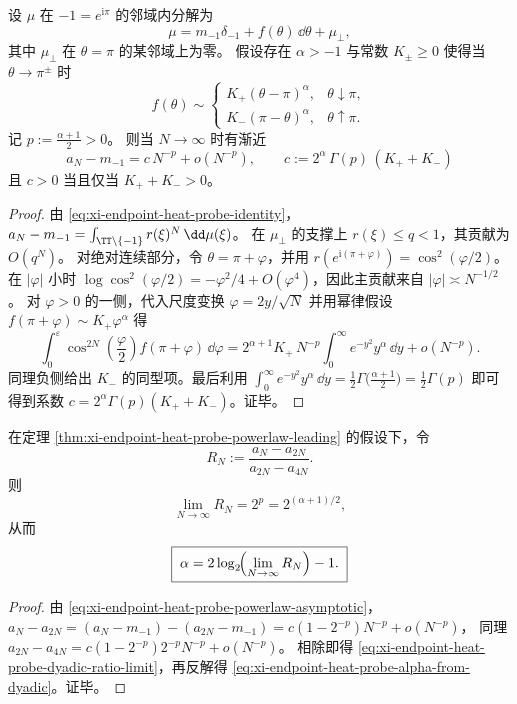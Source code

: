 \begin{theorem}[端点幂律密度诱导的探针主项]\label{thm:xi-endpoint-heat-probe-powerlaw-leading}
设 \(\mu\) 在 \(-1=e^{\mathrm{i}\pi}\) 的邻域内分解为
\[
\mu=m_{-1}\delta_{-1}+f(\theta)\,\dd\theta+\mu_\perp,
\]
其中 \(\mu_\perp\) 在 \(\theta=\pi\) 的某邻域上为零。
假设存在 \(\alpha>-1\) 与常数 \(K_\pm\ge 0\) 使得当 \(\theta\to\pi^\pm\) 时
\[
f(\theta)\sim
\begin{cases}
K_+(\theta-\pi)^\alpha,& \theta\downarrow\pi,\\
K_-(\pi-\theta)^\alpha,& \theta\uparrow\pi.
\end{cases}
\]
记 \(p:=\frac{\alpha+1}{2}>0\)。
则当 \(N\to\infty\) 时有渐近
\begin{equation}\label{eq:xi-endpoint-heat-probe-powerlaw-asymptotic}
\boxed{\;
a_N-m_{-1}
=c\,N^{-p}+o(N^{-p}),\qquad
c:=2^\alpha\,\Gamma(p)\,(K_++K_-)\;}
\end{equation}
且 \(c>0\) 当且仅当 \(K_++K_->0\)。
\end{theorem}
\begin{proof}
由 \eqref{eq:xi-endpoint-heat-probe-identity}，
\(
a_N-m_{-1}=\int_{\TT\setminus\{-1\}}r(\xi)^N\,\dd\mu(\xi)
\)。
在 \(\mu_\perp\) 的支撑上 \(r(\xi)\le q<1\)，其贡献为 \(O(q^N)\)。
对绝对连续部分，令 \(\theta=\pi+\varphi\)，并用
\(
r(e^{\mathrm{i}(\pi+\varphi)})=\cos^2(\varphi/2)
\)。
在 \(|\varphi|\) 小时
\(
\log\cos^2(\varphi/2)=-\varphi^2/4+O(\varphi^4)
\)，因此主贡献来自 \(|\varphi|\asymp N^{-1/2}\)。
对 \(\varphi>0\) 的一侧，代入尺度变换 \(\varphi=2y/\sqrt N\) 并用幂律假设
\(
f(\pi+\varphi)\sim K_+\varphi^\alpha
\) 得
\[
\int_{0}^{\varepsilon}\cos^{2N}\!\left(\frac{\varphi}{2}\right)f(\pi+\varphi)\,\dd\varphi
=2^{\alpha+1}K_+\,N^{-p}\int_{0}^{\infty}e^{-y^2}y^\alpha\,\dd y+o(N^{-p}).
\]
同理负侧给出 \(K_-\) 的同型项。最后利用
\(
\int_0^\infty e^{-y^2}y^\alpha\,\dd y=\frac12\Gamma\!\bigl(\frac{\alpha+1}{2}\bigr)=\frac12\Gamma(p)
\)
即可得到系数 \(c=2^\alpha\Gamma(p)(K_++K_-)\)。证毕。
\end{proof}

\begin{corollary}\label{cor:xi-endpoint-heat-probe-dyadic-exponent-readout}
在定理 \ref{thm:xi-endpoint-heat-probe-powerlaw-leading} 的假设下，令
\[
R_N:=\frac{a_N-a_{2N}}{a_{2N}-a_{4N}}.
\]
则
\begin{equation}\label{eq:xi-endpoint-heat-probe-dyadic-ratio-limit}
\boxed{\;\lim_{N\to\infty}R_N=2^{p}=2^{(\alpha+1)/2},\;}
\end{equation}
从而
\begin{equation}\label{eq:xi-endpoint-heat-probe-alpha-from-dyadic}
\boxed{\;\alpha=2\log_2\!\Bigl(\lim_{N\to\infty}R_N\Bigr)-1.\;}
\end{equation}
\end{corollary}
\begin{proof}
由 \eqref{eq:xi-endpoint-heat-probe-powerlaw-asymptotic}，
\(
a_N-a_{2N}=(a_N-m_{-1})-(a_{2N}-m_{-1})
=c(1-2^{-p})N^{-p}+o(N^{-p})
\)，
同理
\(
a_{2N}-a_{4N}=c(1-2^{-p})2^{-p}N^{-p}+o(N^{-p})
\)。
相除即得 \eqref{eq:xi-endpoint-heat-probe-dyadic-ratio-limit}，再反解得 \eqref{eq:xi-endpoint-heat-probe-alpha-from-dyadic}。证毕。
\end{proof}

